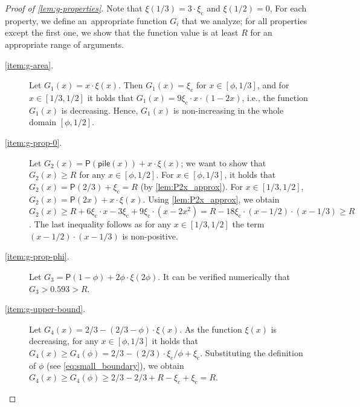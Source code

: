 \documentclass[a4paper,USenglish,cleveref]{lipics-v2019}
\newcommand{\R}{\ensuremath{R}}
\newcommand{\smallBoundary}{\ensuremath{\phi}}
\newcommand{\gconst}{\ensuremath{\xi_\mathrm{c}}}
\newcommand{\g}{\ensuremath{\xi}}
\newcommand{\cutintegral}{\textsf{P}}
\newcommand{\stack}{\textsf{pile}}
\begin{document}
\begin{proof}[Proof of \cref{lem:g-properties}]

Note that $\g(1/3) = 3 \cdot \gconst$ and $\g(1/2) = 0$, 
For each property, we define an~appropriate function $G_i$ that we analyze;
for all properties except the first one, we show that the function 
value is at least $\R$ for an appropriate range of arguments. 

\begin{description}

\item[\cref{item:g-area}.]
Let $G_1(x) = x \cdot \g(x)$. 
Then $G_1(x) = \gconst$ for $x \in [\smallBoundary, 1/3]$, and 
for $x \in [1/3,1/2]$ it holds that $G_1(x) = 9 \gconst \cdot x \cdot (1-2x)$, i.e.,
the function $G_1(x)$ is decreasing. Hence, $G_1(x)$ is non-increasing in the whole domain 
$[\smallBoundary, 1/2]$.

\item[\cref{item:g-prop-0}.]
Let $G_2(x) = \cutintegral(\stack(x)) + x \cdot \g(x)$; we want to show that
$G_2(x) \geq \R$ for any $x \in [\smallBoundary,1/2]$. For $x \in
[\smallBoundary, 1/3]$, it holds that $G_2(x) = \cutintegral(2/3) + \gconst = R$
(by \cref{lem:P2x_approx}). For $x \in [1/3,1/2]$, $G_2(x) = \cutintegral(2x) +
x \cdot \g(x)$. Using \cref{lem:P2x_approx}, we obtain $G_2(x) \geq  \R + 6
\gconst \cdot x - 3 \gconst + 9 \gconst \cdot (x - 2x^2) = \R - 18 \gconst \cdot
(x - 1/2) \cdot (x - 1/3) \geq \R$. The last inequality follows as for any $x
\in [1/3,1/2]$ the term $(x - 1/2) \cdot (x - 1/3)$ is non-positive.

\item[\cref{item:g-prop-phi}.]
Let $G_3 = \cutintegral(1-\smallBoundary) + 2 \smallBoundary \cdot \g(2
\smallBoundary)$. It can be verified numerically that \mbox{$G_3 > 0.593 > \R$}.

\item[\cref{item:g-upper-bound}.] 
Let $G_4(x) = 2/3 - (2/3 - \smallBoundary) \cdot \g(x)$. 
As the function $\g(x)$ is decreasing, for any $x \in [\smallBoundary, 1/3]$ it holds that 
$G_4(x) \geq G_4(\smallBoundary) 
= 2/3 - (2/3) \cdot \gconst / \smallBoundary + \gconst$. Substituting the definition of $\smallBoundary$ 
(see \eqref{eq:small_boundary}), we obtain 
$G_4(x) \geq G_4(\smallBoundary) \geq 2/3 - 2/3 + \R - \gconst + \gconst = \R$. 


\end{description}
\end{proof}
\end{document}
